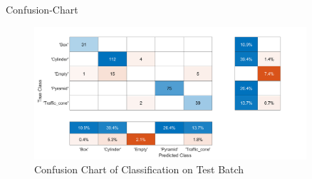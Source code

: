 \documentclass[10pt]{beamer}
\begin{document}
\begin{frame}{Confusion-Chart}
\begin{figure}
    \centering
    \includegraphics[width=0.9\textwidth]{Images/confusionchart.png}
    \caption{Confusion Chart of Classification on Test Batch}
\end{figure}
\end{frame}
\end{document}
